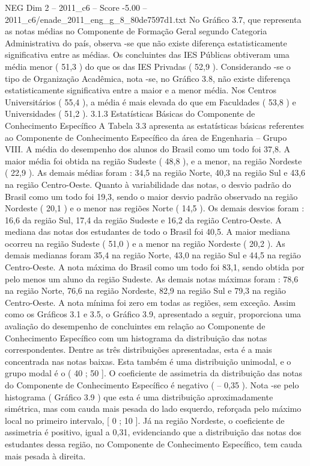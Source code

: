 \begin{textsample}{NEG Dim 2 – 2011\_c6 – Score -5.00 – 2011\_c6/enade\_2011\_eng\_g\_8\_80de7597d1.txt}
No Gráfico 3.7, que representa as notas médias no Componente de Formação Geral segundo Categoria Administrativa do país, observa -se que não existe diferença estatisticamente significativa entre as médias.
Os concluintes das IES Públicas obtiveram uma média menor ( 51,3 ) do que os das IES Privadas ( 52,9 ).
Considerando -se o tipo de Organização Acadêmica, nota -se, no Gráfico 3.8, não existe diferença estatisticamente significativa entre a maior e a menor média.
Nos Centros Universitários ( 55,4 ), a média é mais elevada do que em Faculdades ( 53,8 ) e Universidades ( 51,2 ). 3.1.3 Estatísticas Básicas do Componente de Conhecimento Específico A Tabela 3.3 apresenta as estatísticas básicas referentes ao Componente de Conhecimento Específico da área de Engenharia – Grupo VIII.
A média do desempenho dos alunos do Brasil como um todo foi 37,8.
A maior média foi obtida na região Sudeste ( 48,8 ), e a menor, na região Nordeste ( 22,9 ).
As demais médias foram : 34,5 na região Norte, 40,3 na região Sul e 43,6 na região Centro-Oeste.
Quanto à variabilidade das notas, o desvio padrão do Brasil como um todo foi 19,3, sendo o maior desvio padrão observado na região Nordeste ( 20,1 ) e o menor nas regiões Norte ( 14,5 ).
Os demais desvios foram : 16,6 da região Sul, 17,4 da região Sudeste e 16,2 da região Centro-Oeste.
A mediana das notas dos estudantes de todo o Brasil foi 40,5.
A maior mediana ocorreu na região Sudeste ( 51,0 ) e a menor na região Nordeste ( 20,2 ).
As demais medianas foram 35,4 na região Norte, 43,0 na região Sul e 44,5 na região Centro-Oeste.
A nota máxima do Brasil como um todo foi 83,1, sendo obtida por pelo menos um aluno da região Sudeste.
As demais notas máximas foram : 78,6 na região Norte, 76,6 na região Nordeste, 82,9 na região Sul e 79,3 na região Centro-Oeste.
A nota mínima foi zero em todas as regiões, sem exceção.
Assim como os Gráficos 3.1 e 3.5, o Gráfico 3.9, apresentado a seguir, proporciona uma avaliação do desempenho de concluintes em relação ao Componente de Conhecimento Específico com um histograma da distribuição das notas correspondentes.
Dentre as três distribuições apresentadas, esta é a mais concentrada nas notas baixas.
Esta também é uma distribuição unimodal, e o grupo modal é o ( 40 ; 50 ].
O coeficiente de assimetria da distribuição das notas do Componente de Conhecimento Específico é negativo ( – 0,35 ).
Nota -se pelo histograma ( Gráfico 3.9 ) que esta é uma distribuição aproximadamente simétrica, mas com cauda mais pesada do lado esquerdo, reforçada pelo máximo local no primeiro intervalo, [ 0 ; 10 ].
Já na região Nordeste, o coeficiente de assimetria é positivo, igual a 0,31, evidenciando que a distribuição das notas dos estudantes dessa região, no Componente de Conhecimento Específico, tem cauda mais pesada à direita.

\end{textsample}
